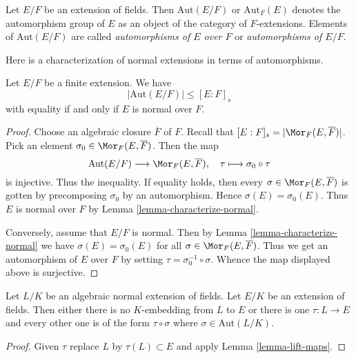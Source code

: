 \begin{definition}
\label{definition-automorphisms}
Let $E/F$ be an extension of fields. Then $\text{Aut}(E/F)$ or
$\text{Aut}_F(E)$ denotes the automorphism group of $E$ as an object
of the category of $F$-extensions. Elements of $\text{Aut}(E/F)$
are called {\it automorphisms of $E$ over $F$} or
{\it automorphisms of $E/F$}.
\end{definition}

\noindent
Here is a characterization of normal extensions in terms of automorphisms.

\begin{lemma}
\label{lemma-normal-and-automorphisms}
Let $E/F$ be a finite extension. We have
$$
|\text{Aut}(E/F)| \leq [E : F]_s
$$
with equality if and only if $E$ is normal over $F$.
\end{lemma}

\begin{proof}
Choose an algebraic closure $\overline{F}$ of $F$. Recall that
$[E : F]_s = |\Mor_F(E, \overline{F})|$. Pick an element
$\sigma_0 \in \Mor_F(E, \overline{F})$. Then the map
$$
\text{Aut}(E/F) \longrightarrow \Mor_F(E, \overline{F}),\quad
\tau \longmapsto \sigma_0 \circ \tau
$$
is injective. Thus the inequality. If equality holds, then
every $\sigma \in \Mor_F(E, \overline{F})$ is gotten by precomposing
$\sigma_0$ by an automorphism. Hence $\sigma(E) = \sigma_0(E)$.
Thus $E$ is normal over $F$ by Lemma \ref{lemma-characterize-normal}.

\medskip\noindent
Conversely, assume that $E/F$ is normal. Then by
Lemma \ref{lemma-characterize-normal} we have $\sigma(E) = \sigma_0(E)$
for all $\sigma \in \Mor_F(E, \overline{F})$.
Thus we get an automorphism of $E$ over $F$ by setting
$\tau = \sigma_0^{-1} \circ \sigma$. Whence the map displayed above
is surjective.
\end{proof}

\begin{lemma}
\label{lemma-normal-embeddings-differ-by-aut}
Let $L/K$ be an algebraic normal extension of fields.
Let $E/K$ be an extension of fields. Then either
there is no $K$-embedding from $L$ to $E$ or
there is one $\tau : L \to E$ and every other
one is of the form $\tau \circ \sigma$ where $\sigma \in \text{Aut}(L/K)$.
\end{lemma}

\begin{proof}
Given $\tau$ replace $L$ by $\tau(L) \subset E$ and apply
Lemma \ref{lemma-lift-maps}.
\end{proof}





